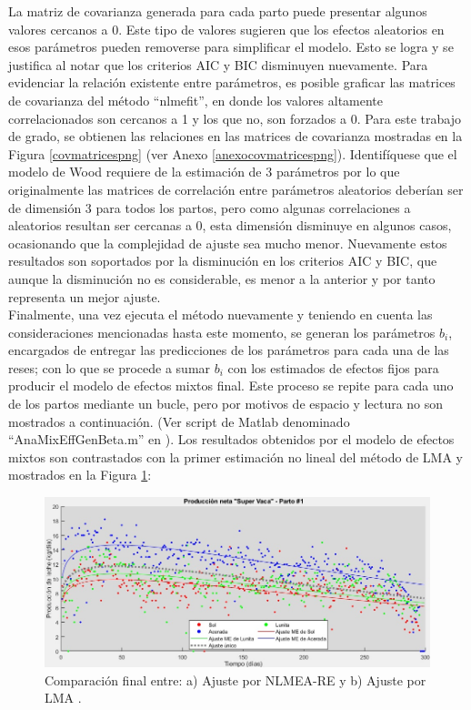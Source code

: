 La matriz de covarianza generada para cada parto puede presentar algunos valores cercanos a 0. Este tipo de valores sugieren que los efectos aleatorios en esos parámetros pueden removerse para simplificar el modelo. Esto se logra y se justifica al notar que los criterios AIC y BIC disminuyen nuevamente. Para evidenciar la relación existente entre parámetros, es posible graficar las matrices de covarianza del método ``nlmefit'', en donde los valores altamente correlacionados son cercanos a 1 y los que no, son forzados a 0. Para este trabajo de grado, se obtienen las relaciones en las matrices de covarianza mostradas en la Figura  \ref{covmatricespng} (ver Anexo \ref{anexocovmatricespng}). Identifíquese que el modelo de Wood requiere de la estimación de 3 parámetros por lo que originalmente las matrices de correlación entre parámetros aleatorios deberían ser de dimensión 3 para todos los partos, pero como algunas correlaciones a aleatorios resultan ser cercanas a 0, esta dimensión disminuye en algunos casos, ocasionando que la complejidad de ajuste sea mucho menor. Nuevamente estos resultados son soportados por la disminución en los criterios AIC y BIC, que aunque la disminución no es considerable, es menor a la anterior y por tanto representa un mejor ajuste.\\

Finalmente, una vez ejecuta el método nuevamente y teniendo en cuenta las consideraciones mencionadas hasta este momento, se generan los parámetros $b_{i}$, encargados de entregar las predicciones de los parámetros para cada una de las reses; con lo que se procede a sumar $b_{i}$ con los estimados de efectos fijos para producir el modelo de efectos mixtos final. Este proceso se repite para cada uno de los partos mediante un bucle, pero por motivos de espacio y lectura no son mostrados a continuación. (Ver script de Matlab denominado ``AnaMixEffGenBeta.m'' en \cite{msclfggprogrepo}). Los resultados obtenidos por el modelo de efectos mixtos son contrastados con la primer estimación no lineal del método de LMA y mostrados en la Figura \ref{mixedfinalpng}:

\begin{figure}[H]
	 \begin{center}
	 \includegraphics[scale=0.5950]{img/mixedfinalspa.jpg}
	 \end{center}
	 \caption{Comparación final entre: a) Ajuste por NLMEA-RE y b) Ajuste por LMA . \label{mixedfinalpng}}
\end{figure}

